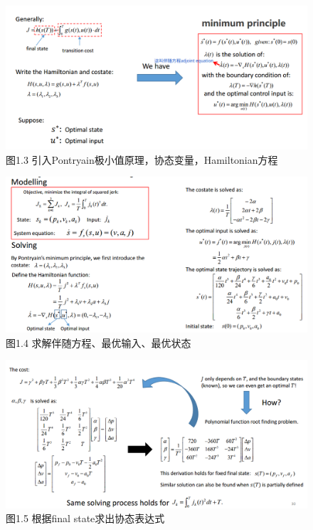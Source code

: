 \documentclass[40pt,a4paper,UTF8]{ctexart}
\numberwithin{equation}{section}
\begin{document}
\begin{figure}[H]
\centering
\includegraphics[width=4.8in]{ch4_3.png} {图1.3 引入Pontryain极小值原理，协态变量，Hamiltonian方程}
\end{figure}

\begin{figure}[H]
\centering
\includegraphics[width=4.8in]{ch4_4.png} {图1.4 求解伴随方程、最优输入、最优状态}
\end{figure}

\begin{figure}[H]
\centering
\includegraphics[width=4.8in]{ch4_5.png} {图1.5 根据final state求出协态表达式}
\end{figure}
\end{document}

